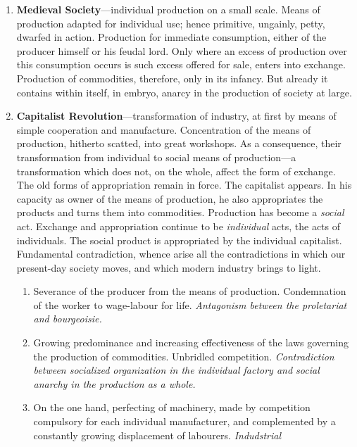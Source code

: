 \begin{enumerate}[label=\textbf{\arabic*.}]
  \item{
    \textbf{Medieval Society}---individual production on a small scale. Means of
    production adapted for individual use; hence primitive, ungainly, petty,
    dwarfed in action. Production for immediate consumption, either of the
    producer himself or his feudal lord. Only where an excess of production over
    this consumption occurs is such excess offered for sale, enters into
    exchange. Production of commodities, therefore, only in its infancy. But
    already it contains within itself, in embryo, anarcy in the production of
    society at large.
  }
  \item{
    \textbf{Capitalist Revolution}---transformation of industry, at first by
    means of simple cooperation and manufacture. Concentration of the means of
    production, hitherto scatted, into great workshops. As a consequence, their
    transformation from individual to social means of production---a
    transformation which does not, on the whole, affect the form of exchange.
    The old forms of appropriation remain in force. The capitalist appears. In
    his capacity as owner of the means of production, he also appropriates the
    products and turns them into commodities. Production has become a
    \emph{social} act. Exchange and appropriation continue to be
    \emph{individual} acts, the acts of individuals. The social product is
    appropriated by the individual capitalist. Fundamental contradiction, whence
    arise all the contradictions in which our present-day society moves, and
    which modern industry brings to light.
    \begin{enumerate}
      \item{
        Severance of the producer from the means of production. Condemnation of
        the worker to wage-labour for life. \emph{Antagonism between the
        proletariat and bourgeoisie.}
       }
       \item{
         Growing predominance and increasing effectiveness of the laws governing
         the production of commodities. Unbridled competition.
         \emph{Contradiction between socialized organization in the individual
         factory and social anarchy in the production as a whole.}
       }
       \item{
         On the one hand, perfecting of machinery, made by competition
         compulsory for each individual manufacturer, and complemented by a
         constantly growing displacement of labourers. \emph{Indudstrial
}}
\end{enumerate}}
\end{enumerate}
